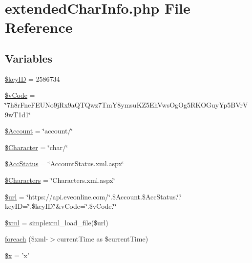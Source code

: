 \hypertarget{extended_char_info_8php}{\section{extended\+Char\+Info.\+php File Reference}
\label{extended_char_info_8php}
}
\subsection*{Variables}
\begin{DoxyCompactItemize}
\item 
\hyperlink{extended_char_info_8php_a19e4271e6a84a7952c9efc65569318bc}{\$key\+I\+D} = 2586734
\item 
\hyperlink{extended_char_info_8php_a55dd43886b9084aeee05444024079444}{\$v\+Code} = \char`\"{}7h8r\+Fne\+F\+E\+U\+No9j\+Rx9a\+Q\+T\+Qwz7\+Tm\+Y8ymsu\+K\+Z5\+Eh\+Vws\+Og\+Og5\+R\+K\+O\+Guy\+Yp5\+B\+Vr\+V9w\+T1d1\char`\"{}
\item 
\hyperlink{extended_char_info_8php_abefc751ae3769a84949f113f6e8ae22f}{\$\+Account} = \char`\"{}account/\char`\"{}
\item 
\hyperlink{extended_char_info_8php_a38da29911be0da333c1f17b6a041918a}{\$\+Character} = \char`\"{}char/\char`\"{}
\item 
\hyperlink{extended_char_info_8php_aa273c7f3c849bf5816ad71a34d67cba4}{\$\+Acc\+Status} = \char`\"{}Account\+Status.\+xml.\+aspx\char`\"{}
\item 
\hyperlink{extended_char_info_8php_a10d1e3a184be06f7c8c027e7797f3620}{\$\+Characters} = \char`\"{}Characters.\+xml.\+aspx\char`\"{}
\item 
\hyperlink{extended_char_info_8php_acf215f34a917d014776ce684a9ee8909}{\$url} = \char`\"{}https\+://api.\+eveonline.\+com/\char`\"{}.\$Account.\$\+Acc\+Status.\char`\"{}?key\+I\+D=\char`\"{}.\$key\+I\+D.\char`\"{}\&v\+Code=\char`\"{}.\$v\+Code.\char`\"{}\char`\"{}
\item 
\hyperlink{extended_char_info_8php_aa108d9d91e700ac530401dd363b0723b}{\$xml} = simplexml\+\_\+load\+\_\+file(\$url)
\item 
\hyperlink{extended_char_info_8php_a444ade3168a017bb623e84a4ff959155}{foreach} (\$xml-\/$>$current\+Time as \$current\+Time)
\item 
\hyperlink{extended_char_info_8php_af3a16c5f0dd7a74cf9acf6a49fff73a7}{\$x} = 'x'
\end{DoxyCompactItemize}


